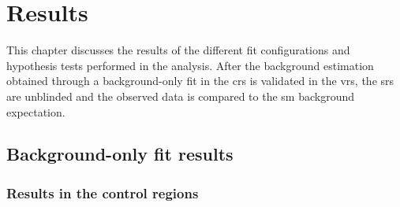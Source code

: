 

\chapter{Results}

\ifpdf
    \graphicspath{{chapter-results/Figs/Raster/}{chapter-results/Figs/PDF/}{chapter-results/Figs/}}
\else
    \graphicspath{{chapter-results/Figs/Vector/}{chapter-results/Figs/}}
\fi

This chapter discusses the results of the different fit configurations and hypothesis tests performed in the analysis. After the background estimation obtained through a background-only fit in the \glspl{cr} is validated in the \glspl{vr}, the \glspl{sr} are unblinded and the observed data is compared to the \gls{sm} background expectation.

\section{Background-only fit results}\label{sec:results_background_only}

\subsection{Results in the control regions}

